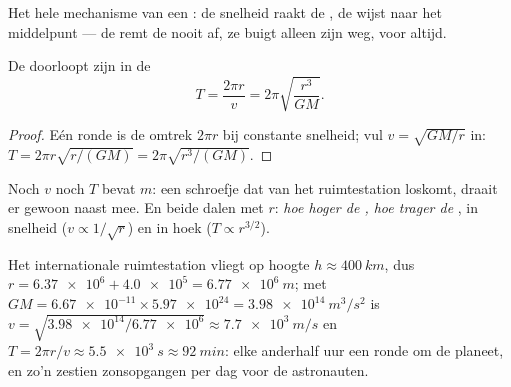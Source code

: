 \begin{omfigure}

{\small Het hele mechanisme van een : de snelheid raakt de ,
de  wijst naar het middelpunt --- de  remt de 
nooit af, ze buigt alleen zijn weg, voor altijd.}
\end{omfigure}

\begin{proposition}\label{prop:g12:satellites-kepler:period}
De  doorloopt zijn  in de 
\[ T = \frac{2\pi r}{v} = 2\pi \sqrt{\frac{r^3}{G M}}. \]
\end{proposition}

\begin{proof}
Eén ronde is de omtrek $2\pi r$ bij constante snelheid; vul
$v = \sqrt{GM/r}$ in: $T = 2\pi r\sqrt{r/(GM)} = 2\pi\sqrt{r^3/(GM)}$.
\end{proof}

Noch $v$ noch $T$ bevat $m$: een schroefje dat van het ruimtestation
loskomt, draait er gewoon naast mee. En beide dalen met $r$: \emph{hoe hoger
de , hoe trager de }, in snelheid
($v \propto 1/\sqrt r$) en in hoek ($T \propto r^{3/2}$).

\begin{example}\label{ex:g12:satellites-kepler:iss}
Het internationale ruimtestation vliegt op hoogte
$h \approx \qty{400}{km}$, dus $r = \num{6.37e6} + \num{4.0e5} =
\qty{6.77e6}{m}$; met $GM = \num{6.67e-11} \times \num{5.97e24} =
\qty{3.98e14}{m^3/s^2}$ is $v = \sqrt{\num{3.98e14}/\num{6.77e6}}
\approx \qty{7.7e3}{m/s}$ en $T = 2\pi r/v \approx \qty{5.5e3}{s}
\approx \qty{92}{min}$: elke anderhalf uur een ronde om de planeet, en zo'n
zestien zonsopgangen per dag voor de astronauten.
\end{example}

